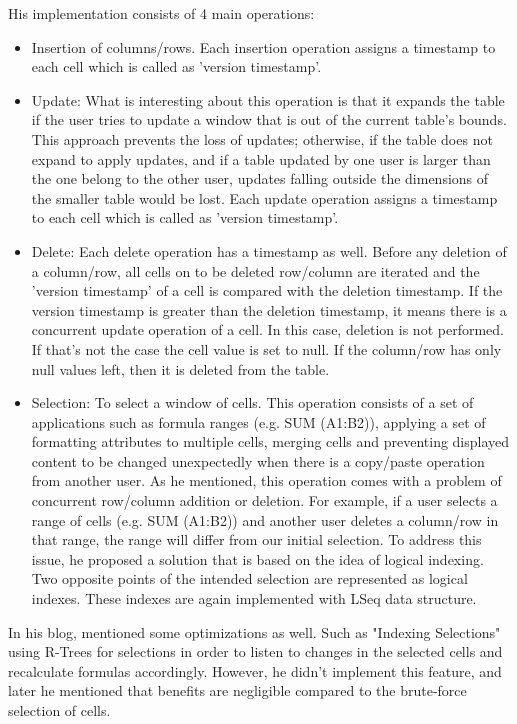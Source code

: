 \documentclass{article}
\begin{document}
His implementation consists of 4 main operations:
\begin{itemize}
    \item Insertion of columns/rows. Each insertion operation assigns a timestamp to each cell which is called as 'version timestamp'. 
    \item Update: What is interesting about this operation is that 
    it expands the table if the user tries to update a window 
    that is out of the current table's bounds.
    This approach prevents the loss of updates; 
    otherwise, if the table does not expand to apply updates, 
    and if a table updated by one user is larger than the one belong to the other user, 
    updates falling outside the dimensions of the smaller table would be lost.
    Each update operation assigns a timestamp to each cell which is called as 'version timestamp'. 
    \item Delete: Each delete operation has a timestamp as well. Before any deletion of a column/row, all cells on to be deleted row/column are iterated 
    and the 'version timestamp' of a cell is compared with the deletion timestamp.
    If the version timestamp is greater than the deletion timestamp, it means there is a concurrent update operation of a cell. 
    In this case, deletion is not performed.
    If that's not the case the cell value is set to null.
    If the column/row has only null values left, then it is deleted from the table.
    \item Selection: To select a window of cells. This operation consists of a set of applications such as formula ranges (e.g. SUM (A1:B2)), 
    applying a set of formatting attributes to multiple cells, merging cells and preventing displayed content to be changed unexpectedly 
    when there is a copy/paste operation from another user. As he mentioned, this operation comes with a problem of concurrent row/column addition or deletion. 
    For example, if a user selects a range of cells (e.g. SUM (A1:B2)) and another user deletes a column/row in that range, the range will differ from our initial selection.
    To address this issue, he proposed a solution that is based on the idea of logical indexing. Two opposite points of the intended selection are represented as
    logical indexes. These indexes are again implemented with LSeq data structure. 
\end{itemize}

In his blog, \textcite{sypytkowski2023crdttables} mentioned some optimizations as well. Such as "Indexing Selections" using R-Trees for selections 
in order to listen to changes in the selected cells and recalculate formulas accordingly. However, he didn't implement this feature, and later he mentioned that 
benefits are negligible compared to the brute-force selection of cells. 
\end{document}

